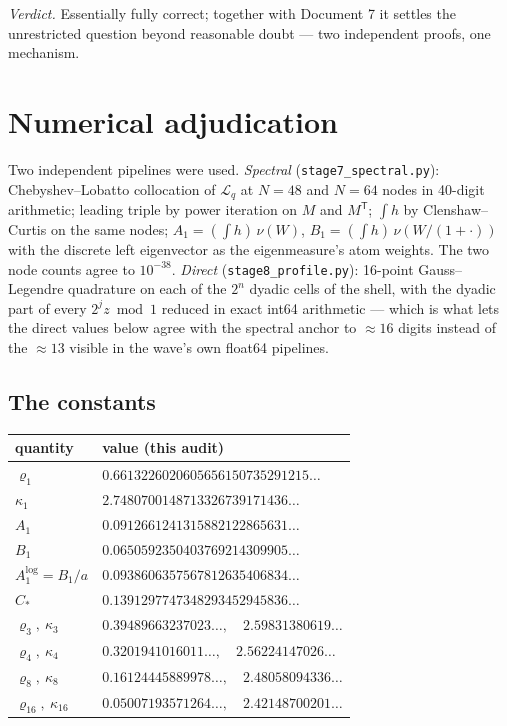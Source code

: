 \documentclass[11pt,oneside]{article}
\theoremstyle{definition}
\theoremstyle{remark}
\newcommand{\Lop}{\mathcal L}
\begin{document}
\emph{Verdict.}  Essentially fully correct; together with Document 7 it
settles the unrestricted question beyond reasonable doubt --- two
independent proofs, one mechanism.

\section{Numerical adjudication}
\label{sec:numerics}

Two independent pipelines were used.
\emph{Spectral} (\nolinkurl{stage7_spectral.py}): Chebyshev--Lobatto
collocation of $\Lop_q$ at $N=48$ and $N=64$ nodes in 40-digit
arithmetic; leading triple by power iteration on $M$ and $M^{\mathsf T}$;
$\int h$ by Clenshaw--Curtis on the same nodes;
$A_1=(\int h)\,\nu(W)$, $B_1=(\int h)\,\nu(W/(1+\cdot))$ with the
discrete left eigenvector as the eigenmeasure's atom weights.  The two
node counts agree to $10^{-38}$.
\emph{Direct} (\nolinkurl{stage8_profile.py}): 16-point Gauss--Legendre
quadrature on each of the $2^n$ dyadic cells of the shell, with the
dyadic part of every $2^jz\bmod1$ reduced in exact int64 arithmetic ---
which is what lets the direct values below agree with the spectral
anchor to $\approx\!16$ digits instead of the $\approx\!13$ visible in
the wave's own float64 pipelines.

\subsection{The constants}
\label{ssec:constants}

\begin{center}
\small
\begin{tabular}{@{}ll@{}}
\toprule
quantity & value (this audit) \\
\midrule
$\varrho_1$ & $0.6613226020605656150735291215\ldots$ \\
$\kappa_1$ & $2.7480700148713326739171436\ldots$ \\
$A_1$ & $0.0912661241315882122865631\ldots$ \\
$B_1$ & $0.0650592350403769214309905\ldots$ \\
$A_1^{\log}=B_1/a$ & $0.0938606357567812635406834\ldots$ \\
$C_*$ & $0.1391297747348293452945836\ldots$ \\
$\varrho_3,\ \kappa_3$ & $0.39489663237023\ldots,\quad 2.59831380619\ldots$ \\
$\varrho_4,\ \kappa_4$ & $0.3201941016011\ldots,\quad 2.56224147026\ldots$ \\
$\varrho_8,\ \kappa_8$ & $0.16124445889978\ldots,\quad 2.48058094336\ldots$ \\
$\varrho_{16},\ \kappa_{16}$ & $0.05007193571264\ldots,\quad 2.42148700201\ldots$ \\
\bottomrule
\end{tabular}
\end{center}
\end{document}
